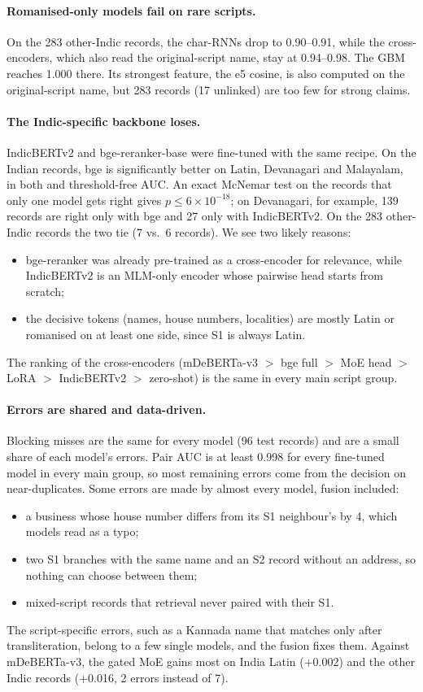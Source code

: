 \paragraph{Romanised-only models fail on rare scripts.} On the 283 other-Indic records, the char-RNNs drop to
0.90--0.91, while the cross-encoders, which also read the original-script name, stay at 0.94--0.98. The GBM
reaches 1.000 there. Its strongest feature, the e5 cosine, is also computed on the original-script name, but
283 records (17 unlinked) are too few for strong claims.

\paragraph{The Indic-specific backbone loses.} IndicBERTv2 and bge-reranker-base were fine-tuned with the
same recipe. On the Indian records, bge is significantly better on Latin, Devanagari and Malayalam, in both
\fhalf{} and threshold-free AUC. An exact McNemar test on the records that only one
model gets right gives $p\le 6\times10^{-18}$; on Devanagari, for example, 139 records are right only with
bge and 27 only with IndicBERTv2. On the 283 other-Indic records the two tie (7 vs.\ 6 records). We see two
likely reasons:
\begin{itemize}
  \item bge-reranker was already pre-trained as a cross-encoder for relevance, while IndicBERTv2 is an
        MLM-only encoder whose pairwise head starts from scratch;
  \item the decisive tokens (names, house numbers, localities) are mostly Latin or romanised on at least
        one side, since S1 is always Latin.
\end{itemize}
The ranking of the cross-encoders (mDeBERTa-v3 $>$ bge full $>$ MoE head $>$ LoRA $>$ IndicBERTv2 $>$
zero-shot) is the same in every main script group.

\paragraph{Errors are shared and data-driven.} Blocking misses are the same for every model (96 test records)
and are a small share of each model's errors. Pair AUC is at least 0.998 for every fine-tuned model in every
main group, so most remaining errors come from the decision on near-duplicates. Some errors are made by
almost every model, fusion included:
\begin{itemize}
  \item a business whose house number differs from its S1 neighbour's by 4, which models read as a typo;
  \item two S1 branches with the same name and an S2 record without an address, so nothing can choose
        between them;
  \item mixed-script records that retrieval never paired with their S1.
\end{itemize}
The script-specific errors, such as a Kannada name that matches only after transliteration, belong to a few
single models, and the fusion fixes them. Against mDeBERTa-v3, the gated MoE gains most on India Latin
(+0.002) and the other Indic records (+0.016, 2 errors instead of 7).

